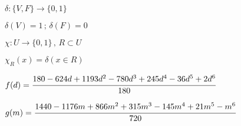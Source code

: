 \documentclass[11pt,a4paper]{article}
\begin{document}
		\normalsize

		$\delta : \{ V, F \} \rightarrow \{ 0, 1 \}$

		$\delta(V) = 1\,;\,\delta(F) = 0$

		\vspace{3mm}

		$\chi : U \rightarrow \{ 0, 1 \}\,,\,R \subset U$

		$\chi_R(x) = \delta(x \in R)$

		\vspace{3mm}

		$f(d) = \cfrac{180-624d+1193d^2-780d^3+245d^4-36d^5+2d^6}{180}$

		\vspace{3mm}

		$g(m) = \cfrac{1440-1176m+866m^2+315m^3-145m^4+21m^5-m^6}{720}$
\end{document}
